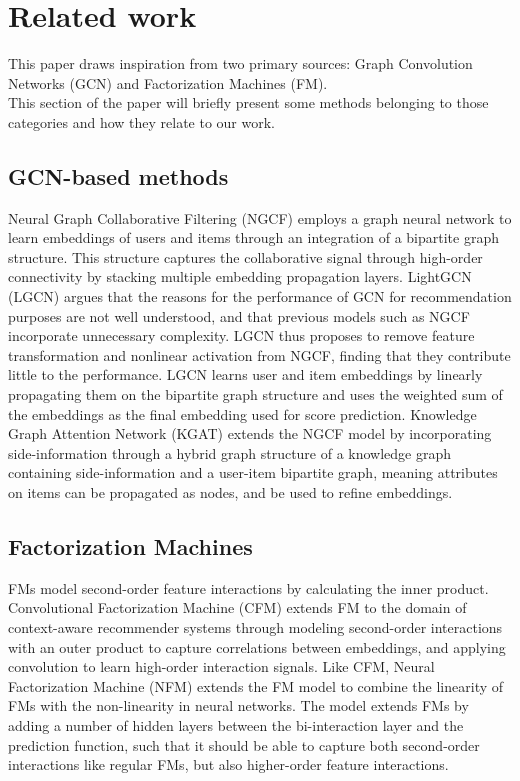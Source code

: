 \section{Related work}\label{sec:relatedwork}
This paper draws inspiration from two primary sources: Graph Convolution Networks (GCN) and Factorization Machines (FM).\\
This section of the paper will briefly present some methods belonging to those categories and how they relate to our work.

\subsection{GCN-based methods}
Neural Graph Collaborative Filtering (NGCF) \cite{NGCF} employs a graph neural network to learn embeddings of users and items through an integration of a bipartite graph structure.
This structure captures the collaborative signal through high-order connectivity by stacking multiple embedding propagation layers.
LightGCN (LGCN) \cite{LightGCN} argues that the reasons for the performance of GCN for recommendation purposes are not well understood, and that previous models such as NGCF incorporate unnecessary complexity.
LGCN thus proposes to remove feature transformation and nonlinear activation from NGCF, finding that they contribute little to the performance.
LGCN learns user and item embeddings by linearly propagating them on the bipartite graph structure and uses the weighted sum of the embeddings as the final embedding used for score prediction.
Knowledge Graph Attention Network (KGAT) \cite{KGAT} extends the NGCF model by incorporating side-information through a hybrid graph structure of a knowledge graph containing side-information and a user-item bipartite graph, meaning attributes on items can be propagated as nodes, and be used to refine embeddings.

\subsection{Factorization Machines}
FMs \cite{fmrendle} model second-order feature interactions by calculating the inner product.
Convolutional Factorization Machine (CFM) \cite{CFM} extends FM to the domain of context-aware recommender systems through modeling second-order interactions with an outer product to capture correlations between embeddings, and applying convolution to learn high-order interaction signals.
Like CFM, Neural Factorization Machine (NFM) \cite{NeuralFM} extends the FM model to combine the linearity of FMs with the non-linearity in neural networks.
The model extends FMs by adding a number of hidden layers between the bi-interaction layer and the prediction function, such that it should be able to capture both second-order interactions like regular FMs, but also higher-order feature interactions. 

